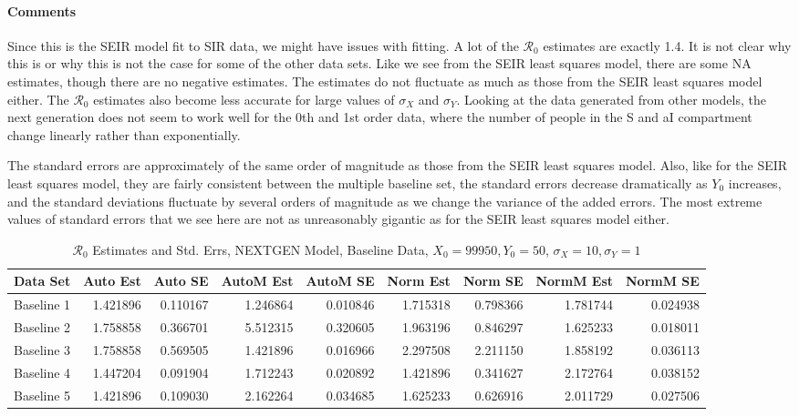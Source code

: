 \documentclass[12pt]{article}
\newcommand{\rr}{\ensuremath{\mathcal{R}_0}}
\begin{document}
\paragraph{Comments}

Since this is the SEIR model fit to SIR data, we might have issues with fitting. A lot of the $\rr$ estimates are exactly 1.4. It is not clear why this is or why this is not the case for some of the other data sets. Like we see from the SEIR least squares model, there are some NA estimates, though there are no negative estimates. The estimates do not fluctuate as much as those from the SEIR least squares model either. The $\rr$ estimates also become less accurate for large values of $\sigma_X$ and $\sigma_Y$. Looking at the data generated from other models, the next generation does not seem to work well for the 0th and 1st order data, where the number of people in the S and aI compartment change linearly rather than exponentially.

The standard errors are approximately of the same order of magnitude as those from the SEIR least squares model. Also, like for the SEIR least squares model, they are fairly consistent between the multiple baseline set, the standard errors decrease dramatically as $Y_0$ increases, and the standard deviations fluctuate by several orders of magnitude as we change the variance of the added errors. The most extreme values of standard errors that we see here are not as unreasonably gigantic as for the SEIR least squares model either.

\begin{table}[H]
	
	\caption{$\rr$ Estimates and Std. Errs, NEXTGEN Model, 
		Baseline Data, $X_0 = 99950, Y_0 = 50$, 
		$\sigma_X = 10, \sigma_Y = 1$}
	\begin{footnotesize}
		\hskip -1cm
		\begin{tabular}{l|r|r|r|r|r|r|r|r}
			\hline
			Data Set & Auto Est & Auto SE & AutoM Est & AutoM SE & Norm Est & Norm SE & NormM Est & NormM SE\\
			\hline
			Baseline 1 & 1.421896 & 0.110167 & 1.246864 & 0.010846 & 1.715318 & 0.798366 & 1.781744 & 0.024938\\
			\hline
			Baseline 2 & 1.758858 & 0.366701 & 5.512315 & 0.320605 & 1.963196 & 0.846297 & 1.625233 & 0.018011\\
			\hline
			Baseline 3 & 1.758858 & 0.569505 & 1.421896 & 0.016966 & 2.297508 & 2.211150 & 1.858192 & 0.036113\\
			\hline
			Baseline 4 & 1.447204 & 0.091904 & 1.712243 & 0.020892 & 1.421896 & 0.341627 & 2.172764 & 0.038152\\
			\hline
			Baseline 5 & 1.421896 & 0.109030 & 2.162264 & 0.034685 & 1.625233 & 0.626916 & 2.011729 & 0.027506\\
			\hline
		\end{tabular}
	\end{footnotesize}
\end{table}
\end{document}
